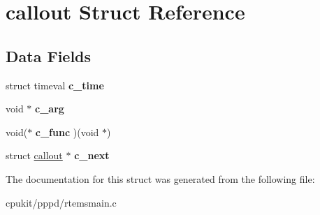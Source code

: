 \hypertarget{structcallout}{}\section{callout Struct Reference}
\label{structcallout}
\subsection*{Data Fields}
\begin{DoxyCompactItemize}
\item 
\mbox{\label{structcallout_afc880bc4eedc2e74a9e823e4f1ec27d3}} 
struct timeval {\bfseries c\+\_\+time}
\item 
\mbox{\label{structcallout_a22ffa8ed70ce1a329dc5e501afa831b4}} 
void $\ast$ {\bfseries c\+\_\+arg}
\item 
\mbox{\label{structcallout_a8ebd9d9dcb146becd7aa53d99d6c3b1b}} 
void($\ast$ {\bfseries c\+\_\+func} )(void $\ast$)
\item 
\mbox{\label{structcallout_ae76bb77516511eda47aea0c5ac705a4d}} 
struct \mbox{\hyperlink{structcallout}{callout}} $\ast$ {\bfseries c\+\_\+next}
\end{DoxyCompactItemize}


The documentation for this struct was generated from the following file\+:\begin{DoxyCompactItemize}
\item 
cpukit/pppd/rtemsmain.\+c\end{DoxyCompactItemize}
